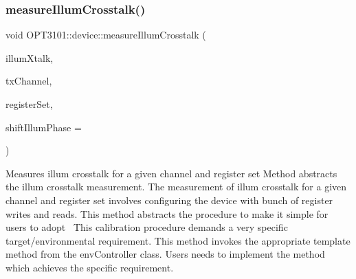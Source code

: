 \subsubsection{\texorpdfstring{measure\+Illum\+Crosstalk()}{measureIllumCrosstalk()}}
{\footnotesize\ttfamily void O\+P\+T3101\+::device\+::measure\+Illum\+Crosstalk (\begin{DoxyParamCaption}\item[{\mbox{\hyperlink{class_o_p_t3101_1_1crosstalk_c}{O\+P\+T3101\+::crosstalkC}} $\ast$}]{illum\+Xtalk,  }\item[{uint8\+\_\+t}]{tx\+Channel,  }\item[{char}]{register\+Set,  }\item[{uint8\+\_\+t}]{shift\+Illum\+Phase = {} }\end{DoxyParamCaption})}



Measures illum crosstalk for a given channel and register set Method abstracts the illum crosstalk measurement. The measurement of illum crosstalk for a given channel and register set involves configuring the device with bunch of register writes and reads. This method abstracts the procedure to make it simple for users to adopt~\newline
 This calibration procedure demands a very specific target/environmental requirement. This method invokes the appropriate template method from the env\+Controller class. Users needs to implement the method which achieves the specific requirement. 


